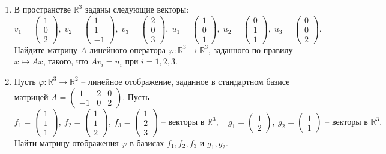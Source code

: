\documentclass[a4paper,12pt]{article}
\begin{document}
\begin{enumerate}
\vspace{5pt}


\item В пространстве $\mathbb R^3$ заданы следующие векторы:
\[
v_1 =
\begin{pmatrix}
{1}\\{0}\\{2}
\end{pmatrix}
,\;
v_2 =
\begin{pmatrix}
{1}\\{1}\\{-1}
\end{pmatrix}
,\;
v_3 =
\begin{pmatrix}
{2}\\{0}\\{3}
\end{pmatrix}
,\;
u_1 =
\begin{pmatrix}
{1}\\{0}\\{1}
\end{pmatrix}
,\;
u_2 =
\begin{pmatrix}
{0}\\{1}\\{1}
\end{pmatrix}
,\;
u_3 =
\begin{pmatrix}
{0}\\{0}\\{2}
\end{pmatrix}.
\]
Найдите матрицу $A$ линейного оператора $\varphi\colon \mathbb R^3\to \mathbb R^3$, заданного по правилу $x\mapsto Ax$, такого, что $A v_i = u_i$ при $i = 1, 2, 3$. 

\vspace{5pt}



\item Пусть $\varphi\colon \mathbb R^3\to \mathbb R^2$ -- линейное отображение, заданное в стандартном базисе матрицей $A = \left(\begin{smallmatrix}{1}&{2}&{0}\\{-1}&{0}&{2}\end{smallmatrix}\right)$.  Пусть
\[
f_1 = 
\begin{pmatrix}
{1}\\{1}\\{1}
\end{pmatrix},\:
f_2 = 
\begin{pmatrix}
{1}\\{1}\\{2}
\end{pmatrix},\:
f_3 = 
\begin{pmatrix}
{1}\\{2}\\{3}
\end{pmatrix}\text{ -- \ векторы в } \mathbb R^3,\quad
g_1 =
\begin{pmatrix}
{1}\\{2}
\end{pmatrix},\:
g_2 =
\begin{pmatrix}
{1}\\{1}
\end{pmatrix}\text{ -- \ векторы в } \mathbb R^3.
\]
Найти матрицу отображения $\varphi$ в базисах $f_1,f_2,f_3$ и $g_1,g_2$.


\end{enumerate}
\end{document}
